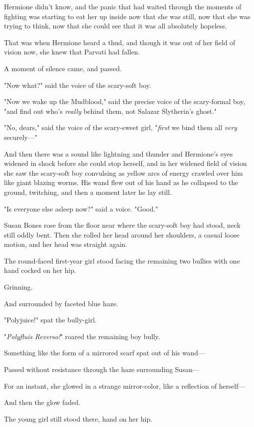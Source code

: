 Hermione didn't know, and the panic that had waited through the moments of
fighting was starting to eat her up inside now that she was still, now that she
was trying to think, now that she could see that it was all absolutely hopeless.

That was when Hermione heard a thud, and though it was out of her field of
vision now, she knew that Parvati had fallen.

A moment of silence came, and passed.

"Now what?" said the voice of the scary-soft boy.

"Now we wake up the Mudblood," said the precise voice of the scary-formal boy,
"and find out who's \emph{really} behind them, not Salazar Slytherin's ghost."

"No, dears," said the voice of the scary-sweet girl, "\emph{first} we bind them
all \emph{very} securely\mbox{---}"

And then there was a sound like lightning and thunder and Hermione's eyes
widened in shock before she could stop herself, and in her widened field of
vision she saw the scary-soft boy convulsing as yellow arcs of energy crawled
over him like giant blazing worms. His wand flew out of his hand as he
collapsed to the ground, twitching, and then a moment later he lay still.

"Is everyone else asleep now?" said a voice. "Good."

Susan Bones rose from the floor near where the scary-soft boy had stood, neck
still oddly bent. Then she rolled her head around her shoulders, a casual loose
motion, and her head was straight again.

The round-faced first-year girl stood facing the remaining two bullies with one
hand cocked on her hip.

Grinning.

And surrounded by faceted blue haze.

"Polyjuice!" spat the bully-girl.

"\emph{Polyfluis Reverso!}" roared the remaining boy bully.

Something like the form of a mirrored scarf spat out of his wand\mbox{---}

Passed without resistance through the haze surrounding Susan\mbox{---}

For an instant, she glowed in a strange mirror-color, like a reflection of
herself\mbox{---}

And then the glow faded.

The young girl still stood there, hand on her hip.

